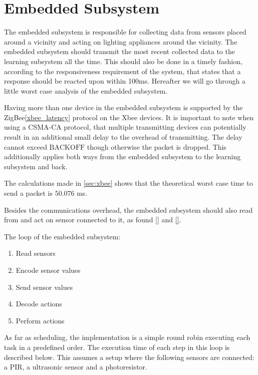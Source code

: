 \section{Embedded Subsystem}\label{sub:sensorStation}

The embedded subsystem is responsible for collecting data from sensors placed around a vicinity and acting on lighting appliances around the vicinity. The embedded subsystem should transmit the most recent collected data to the learning subsystem all the time. This should also be done in a timely fashion, according to the responsiveness requirement of the system, that states that a response should be reacted upon within 100ms. Hereafter we will go through a little worst case analysis of the embedded subsystem.

Having more than one device in the embedded subsystem is supported by the ZigBee\cref{xbee_latency} protocol on the Xbee devices. It is important to note when using a CSMA-CA protocol, that multiple transmitting devices can potentially result in an additional small delay to the overhead of transmitting. The delay cannot exceed $\text{BACKOFF}$ though otherwise the packet is dropped. This additionally applies both ways from the embedded subsystem to the learning subsystem and back.

The calculations made in \cref{sec:xbee} shows that the theoretical worst case time to send a packet is $50.076$ ms.

Besides the communications overhead, the embedded subsystem should also read from and act on sensor connected to it,  as found \cref{} and \cref{}.

The loop of the embedded subsystem:
\begin{enumerate}
  \item Read sensors
  \item Encode sensor values
  \item Send sensor values
  \item Decode actions
  \item Perform actions
\end{enumerate}

As far as scheduling, the implementation is a simple round robin executing each task in a predefined order. The execution time of each step in this loop is described below. This assumes a setup where the following sensors are connected: a PIR, a ultrasonic sensor and a photoresistor.

